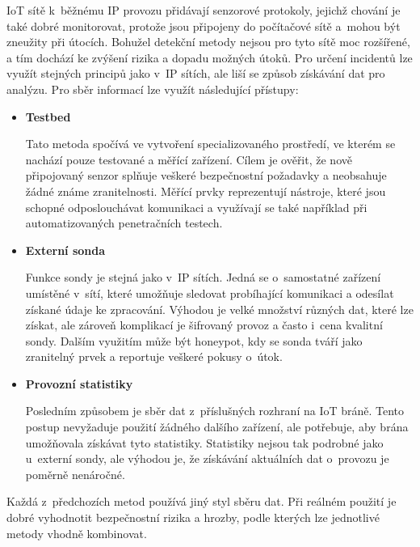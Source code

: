  IoT sítě k~běžnému IP provozu přidávají senzorové protokoly, jejichž chování je také dobré monitorovat, 
 protože jsou připojeny do počítačové sítě a~mohou být zneužity při útocích. Bohužel detekční metody 
 nejsou pro tyto sítě moc rozšířené, a tím dochází ke zvýšení rizika a dopadu možných útoků. Pro určení 
 incidentů lze využít stejných principů jako v~IP sítích, ale liší se způsob získávání dat pro analýzu. 
 Pro sběr informací lze využít následující přístupy:
 \begin{itemize}
  \item \textbf{Testbed}
  
    Tato metoda spočívá ve vytvoření specializovaného prostředí, ve kterém se nachází pouze testované 
    a měřící zařízení. Cílem je ověřit, že nově připojovaný senzor splňuje veškeré bezpečnostní 
    požadavky a neobsahuje žádné známe zranitelnosti. Měřící prvky reprezentují nástroje, které 
    jsou schopné odposlouchávat komunikaci a využívají se také například při automatizovaných
    penetračních testech.   
  \item \textbf{Externí sonda}
  
  Funkce sondy je stejná jako v~IP sítích. Jedná se o~samostatné zařízení umístěné v~sítí, které
  umožňuje sledovat probíhající komunikaci a odesílat získané údaje ke zpracování. 
  Výhodou je velké množství různých  dat, které lze získat, ale zároveň komplikací je šifrovaný provoz
  a často i~cena kvalitní sondy.
  Dalším využitím 
  může být honeypot, kdy se sonda tváří jako zranitelný prvek a reportuje veškeré pokusy o~útok.
    
  \item \textbf{Provozní statistiky}
  
  Posledním způsobem je sběr dat z~příslušných rozhraní na IoT bráně. Tento postup nevyžaduje použití
  žádného dalšího zařízení, ale potřebuje, aby brána umožňovala získávat tyto statistiky. 
  Statistiky nejsou tak podrobné jako u~externí sondy, ale výhodou je, 
  že získávání aktuálních dat o~provozu je poměrně nenáročné.
 \end{itemize}
 
 Každá z~předchozích metod používá jiný styl sběru dat. Při reálném použití je dobré vyhodnotit 
 bezpečnostní rizika a hrozby, podle kterých lze jednotlivé metody vhodně kombinovat.

 \newpage
